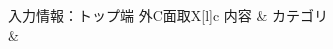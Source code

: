 \clearpage

\begin{multicollongtblr}{入力情報：トップ端 外C面取}{X[l]c}
内容 & カテゴリ\\
 &\\
\end{multicollongtblr}

\clearpage